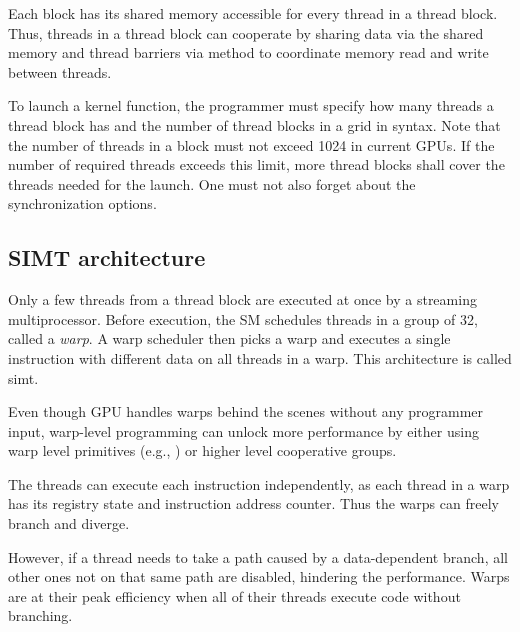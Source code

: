 Each block has its shared memory accessible for every thread in a thread block. Thus, threads in a thread block can cooperate by sharing data via the shared memory and thread barriers via  method to coordinate memory read and write between threads.

To launch a kernel function, the programmer must specify how many threads a thread block has and the number of thread blocks in a grid in  syntax. Note that the number of threads in a block must not exceed 1024 in current GPUs. If the number of required threads exceeds this limit, more thread blocks shall cover the threads needed for the launch. One must not also forget about the synchronization options.

\subsection{SIMT architecture}

Only a few threads from a thread block are executed at once by a streaming multiprocessor. Before execution, the SM schedules threads in a group of 32, called a \textit{warp}. A warp scheduler then picks a warp and executes a single instruction with different data on all threads in a warp. This architecture is called \acrfull{simt}.

Even though GPU handles warps behind the scenes without any programmer input, warp-level programming can unlock more performance by either using warp level primitives (e.g., ) or higher level cooperative groups.

The threads can execute each instruction independently, as each thread in a warp has its registry state and instruction address counter. Thus the warps can freely branch and diverge.

However, if a thread needs to take a path caused by a data-dependent branch, all other ones not on that same path are disabled, hindering the performance. Warps are at their peak efficiency when all of their threads execute code without branching.